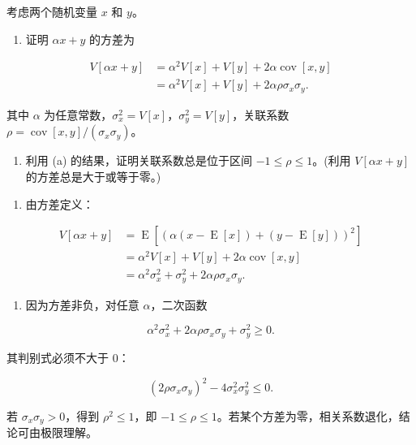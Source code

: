 \begin{question}
考虑两个随机变量 \(x\) 和 \(y\)。

\begin{enumerate}
\item
  证明 \(\alpha x+y\) 的方差为
\end{enumerate}

\[
\begin{split}
V[\alpha x+y]&=\alpha^2 V[x]+V[y]+2\alpha\operatorname{cov}[x,y]\\
&=\alpha^2 V[x]+V[y]+2\alpha\rho\sigma_x\sigma_y.
\end{split}
\]

其中 \(\alpha\) 为任意常数，\(\sigma_x^2=V[x]\)，\(\sigma_y^2=V[y]\)，关联系数 \(\rho=\operatorname{cov}[x,y]/(\sigma_x\sigma_y)\)。

\begin{enumerate}[start=2]
\item 利用 (a) 的结果，证明关联系数总是位于区间 \(-1\le \rho\le 1\)。(利用 \(V[\alpha x+y]\) 的方差总是大于或等于零。)
\end{enumerate}
\begin{solution}
\begin{enumerate}
\item
  由方差定义：
\end{enumerate}

\[
\begin{split}
V[\alpha x+y]
&=\operatorname{E}[(\alpha(x-\operatorname{E}[x])+(y-\operatorname{E}[y]))^2]\\
&=\alpha^2V[x]+V[y]+2\alpha\operatorname{cov}[x,y]\\
&=\alpha^2\sigma_x^2+\sigma_y^2+2\alpha\rho\sigma_x\sigma_y.
\end{split}
\]

\begin{enumerate}[start=2]
\item
  因为方差非负，对任意 \(\alpha\)，二次函数
\end{enumerate}

\[
\alpha^2\sigma_x^2+2\alpha\rho\sigma_x\sigma_y+
\sigma_y^2\ge0.
\]

其判别式必须不大于 0：

\[
(2\rho\sigma_x\sigma_y)^2-4\sigma_x^2\sigma_y^2\le0.
\]

若 \(\sigma_x\sigma_y>0\)，得到 \(\rho^2\le1\)，即
\(-1\le\rho\le1\)。若某个方差为零，相关系数退化，结论可由极限理解。
\end{solution}
\end{question}


